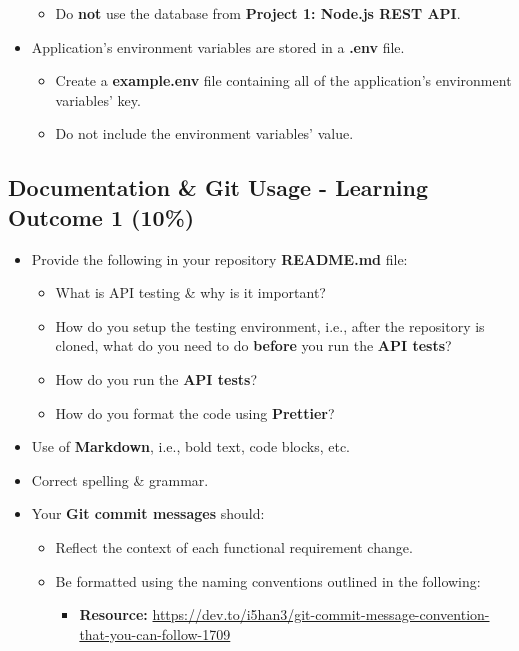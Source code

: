 \documentclass{article}
\begin{document}
\begin{itemize}
\begin{itemize}
      \item Do \textbf{not} use the database from \textbf{Project 1: Node.js REST API}.
    \end{itemize}
    \item Application's environment variables are stored in a \textbf{.env} file.
    \begin{itemize}
      \item Create a \textbf{example.env} file containing all of the application's environment variables' key. 
      \item Do not include the environment variables' value.
    \end{itemize}
\end{itemize}

\subsection*{Documentation \& Git Usage - Learning Outcome 1 (10\%)}
\begin{itemize}
    \item Provide the following in your repository \textbf{README.md} file:
    \begin{itemize} 
      \item What is API testing \& why is it important?
      \item How do you setup the testing environment, i.e., after the repository is cloned, what do you need to do \textbf{before} you run the \textbf{API tests}?
      \item How do you run the \textbf{API tests}?
      \item How do you format the code using \textbf{Prettier}?
    \end{itemize}
    \item Use of \textbf{Markdown}, i.e., bold text, code blocks, etc.
    \item Correct spelling \& grammar.
    \item Your \textbf{Git commit messages} should:
    \begin{itemize}
      \item Reflect the context of each functional requirement change. 
      \item Be formatted using the naming conventions outlined in the following:
            \begin{itemize}
              \item \textbf{Resource:} \small\href{https://dev.to/i5han3/git-commit-message-convention-that-you-can-follow-1709}{https://dev.to/i5han3/git-commit-message-convention-that-you-can-follow-1709}
            \end{itemize} 
    \end{itemize}
\end{itemize}
          
\end{document}
